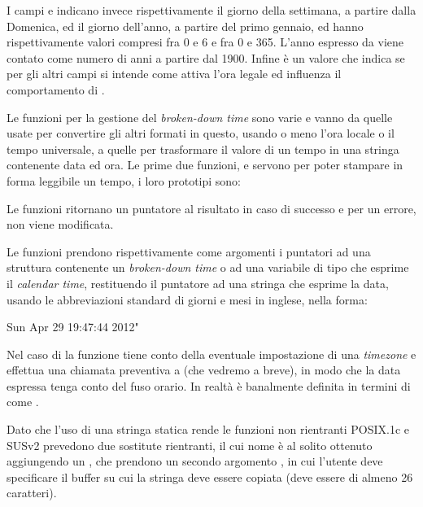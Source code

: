 I campi  e  indicano invece rispettivamente il
giorno della settimana, a partire dalla Domenica, ed il giorno dell'anno, a
partire del primo gennaio, ed hanno rispettivamente valori compresi fra 0 e 6
e fra 0 e 365. L'anno espresso da  viene contato come numero di
anni a partire dal 1900. Infine  è un valore che indica se per
gli altri campi si intende come attiva l'ora legale ed influenza il
comportamento di .


Le funzioni per la gestione del \textit{broken-down time} sono varie e vanno
da quelle usate per convertire gli altri formati in questo, usando o meno
l'ora locale o il tempo universale, a quelle per trasformare il valore di un
tempo in una stringa contenente data ed ora. Le prime due funzioni,
 e  servono per poter stampare in forma leggibile
un tempo, i loro prototipi sono:

\begin{funcproto}{
}

{Le funzioni ritornano un puntatore al risultato in caso di successo e
   per un errore,  non viene modificata.}
\end{funcproto}

Le funzioni prendono rispettivamente come argomenti i puntatori ad una
struttura  contenente un \textit{broken-down time} o ad una
variabile di tipo  che esprime il \textit{calendar time},
restituendo il puntatore ad una stringa che esprime la data, usando le
abbreviazioni standard di giorni e mesi in inglese, nella forma:
\begin{Example}
Sun Apr 29 19:47:44 2012\n"
\end{Example}

Nel caso di  la funzione tiene conto della eventuale impostazione
di una \textit{timezone} e effettua una chiamata preventiva a 
(che vedremo a breve), in modo che la data espressa tenga conto del fuso
orario. In realtà  è banalmente definita in termini di
 come .

Dato che l'uso di una stringa statica rende le funzioni non rientranti
POSIX.1c e SUSv2 prevedono due sostitute rientranti, il cui nome è al solito
ottenuto aggiungendo un , che prendono un secondo argomento
, in cui l'utente deve specificare il buffer su cui la stringa
deve essere copiata (deve essere di almeno 26 caratteri).

